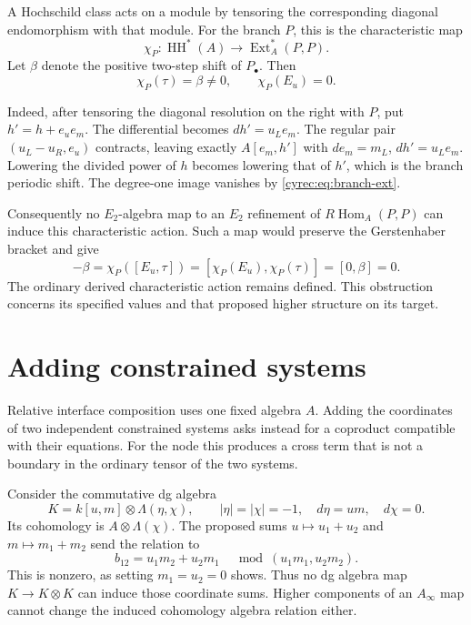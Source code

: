 A Hochschild class acts on a module by tensoring the corresponding
diagonal endomorphism with that module. For the branch $P$, this
is the characteristic map
\[
 \chi_P:\operatorname{HH}^*(A)\longrightarrow
                                      \operatorname{Ext}_A^*(P,P).
\]
Let $\beta$ denote the positive two-step shift of $P_\bullet$.
Then
\begin{equation}\label{cyrec:eq:characteristic-values}
 \chi_P(\tau)=\beta\ne0,\qquad\chi_P(E_u)=0.
\end{equation}

Indeed, after tensoring the diagonal resolution on the right with
$P$, put $h'=h+e_ue_m$. The differential becomes $dh'=u_Le_m$.
The regular pair $(u_L-u_R,e_u)$ contracts, leaving exactly
$A[e_m,h']$ with $de_m=m_L$, $dh'=u_Le_m$.
Lowering the divided power of $h$ becomes lowering that of $h'$,
which is the branch periodic shift. The degree-one image vanishes
by \eqref{cyrec:eq:branch-ext}.

Consequently no $E_2$-algebra map to an $E_2$ refinement of
$R\operatorname{Hom}_A(P,P)$ can induce this characteristic
action. Such a map would preserve the Gerstenhaber bracket and
give
\[
 -\beta=\chi_P([E_u,\tau])
                  =[\chi_P(E_u),\chi_P(\tau)]=[0,\beta]=0.
\]
The ordinary derived characteristic action remains defined.
This obstruction concerns its specified values and that proposed
higher structure on its target.

\section{Adding constrained systems}

Relative interface composition uses one fixed algebra $A$.
Adding the coordinates of two independent constrained systems
asks instead for a coproduct compatible with their equations.
For the node this produces a cross term that is not a boundary
in the ordinary tensor of the two systems.

Consider the commutative dg algebra
\begin{equation}\label{cyrec:eq:constrained-node}
 K=k[u,m]\otimes\Lambda(\eta,\chi),\qquad
 |\eta|=|\chi|=-1,\quad d\eta=um,\quad d\chi=0.
\end{equation}
Its cohomology is $A\otimes\Lambda(\chi)$.
The proposed sums $u\mapsto u_1+u_2$ and
$m\mapsto m_1+m_2$ send the relation to
\[
 b_{12}=u_1m_2+u_2m_1
          \quad\bmod (u_1m_1,u_2m_2).
\]
This is nonzero, as setting $m_1=u_2=0$ shows.
Thus no dg algebra map $K\to K\otimes K$ can induce those
coordinate sums. Higher components of an $A_\infty$ map cannot
change the induced cohomology algebra relation either.

